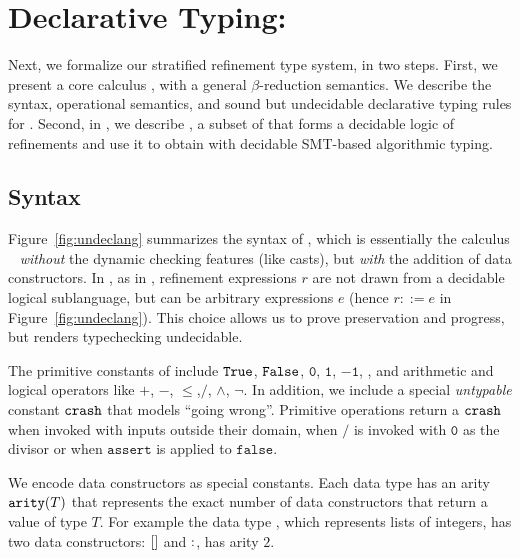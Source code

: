 \section{Declarative Typing: \undeclang}\label{sec:language}\label{sec:undec}

Next, we formalize our stratified refinement type system, in two steps.
%
First,  we present a core calculus \undeclang, 
with a general $\beta$-reduction semantics. We describe the syntax,
operational semantics, and sound but undecidable declarative typing 
rules for \undeclang. 
%
Second, in , we describe \logiclang, a subset 
of \undeclang that forms a decidable logic of refinements and 
use it to obtain \declang with decidable SMT-based algorithmic typing.

\subsection{Syntax}\label{sec:undec:syntax} 



Figure~\ref{fig:undeclang} summarizes the syntax of \undeclang, 
which is essentially the calculus \hlang~\cite{Knowles10} 
\emph{without} the dynamic checking features (like casts), but 
\emph{with} the addition of data constructors.
%
In \undeclang, as in \hlang, refinement expressions $r$ are not drawn from a decidable 
logical sublanguage, but can be arbitrary expressions $e$
(hence $r ::= e$ in Figure~\ref{fig:undeclang}). 
This choice allows us to prove preservation and progress, 
but renders typechecking undecidable. 
 

The primitive constants of \undeclang include  
$\mathtt{True}$, $\mathtt{False}$, $\mathtt{0}$, $\mathtt{1}$, $\mathtt{-1}$, \etc,
and arithmetic and logical operators like $\mathtt{+}$, $\mathtt{-}$, 
$\mathtt{\leq}$,$\mathtt{/}$, $\mathtt{\land}$, $\mathtt{\lnot}$.
%
In addition, we include a special \emph{untypable} constant $\mathtt{crash}$ 
that models ``going wrong''. Primitive operations return a $\mathtt{crash}$
when invoked with inputs outside their domain, \eg when $\mathtt{/}$ 
is invoked with $\mathtt{0}$ as the divisor or when $\mathtt{assert}$ is 
applied to $\mathtt{false}$.

We encode data constructors as special constants. 
Each data type has an arity $\texttt{arity}(T)$ that represents
the exact number of data constructors that return a value of 
type $T$.
%
For example the data type \tintlist, which represents 
lists of integers, has two data constructors: $[]$ and $:$,
\ie has arity $2$.


